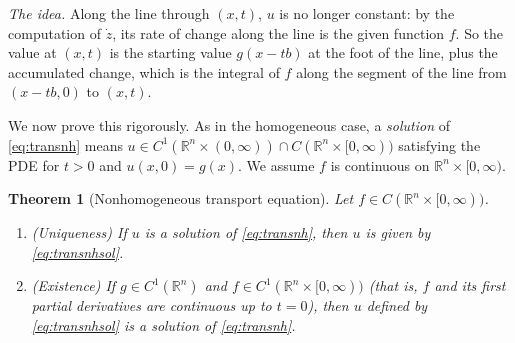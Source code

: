 \documentclass[11pt]{article}
\theoremstyle{plain}
\newtheorem{theorem}{Theorem}[section]
\theoremstyle{definition}
\theoremstyle{remark}
\begin{document}
\emph{The idea.} Along the line through $(x,t)$, $u$ is no longer constant: by the computation of $\dot z$, its rate of change along the line is the given function $f$. So the value at $(x,t)$ is the starting value $g(x - tb)$ at the foot of the line, plus the accumulated change, which is the integral of $f$ along the segment of the line from $(x - tb, 0)$ to $(x,t)$.

We now prove this rigorously. As in the homogeneous case, a \emph{solution} of \eqref{eq:transnh} means $u \in C^1(\mathbb{R}^n\times(0,\infty)) \cap C(\mathbb{R}^n\times[0,\infty))$ satisfying the PDE for $t > 0$ and $u(x,0) = g(x)$. We assume $f$ is continuous on $\mathbb{R}^n \times [0,\infty)$.

\begin{theorem}[Nonhomogeneous transport equation]\label{thm:transportnh}
Let $f \in C(\mathbb{R}^n \times [0,\infty))$.
\begin{enumerate}
    \item[(a)] (Uniqueness) If $u$ is a solution of \eqref{eq:transnh}, then $u$ is given by \eqref{eq:transnhsol}.
    \item[(b)] (Existence) If $g \in C^1(\mathbb{R}^n)$ and $f \in C^1(\mathbb{R}^n\times[0,\infty))$ (that is, $f$ and its first partial derivatives are continuous up to $t = 0$), then $u$ defined by \eqref{eq:transnhsol} is a solution of \eqref{eq:transnh}.
\end{enumerate}
\end{theorem}
\end{document}
